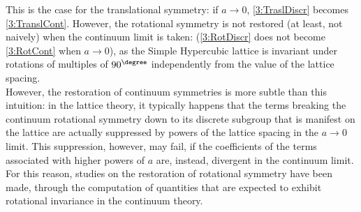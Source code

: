 This is the case for the translational symmetry: if $a\to0$, \eqref{3:TraslDiscr} becomes \eqref{3:TranslCont}.
However, the rotational symmetry is not restored (at least, not naively) when the continuum limit is taken: (\eqref{3:RotDiscr} does not become \eqref{3:RotCont} when $a\to0$), as the Simple Hypercubic lattice is invariant under rotations of multiples of $90^\degree$ independently from the value of the lattice spacing.\\
However, the restoration of continuum symmetries is more subtle than this intuition: in the lattice theory, it typically happens that the terms breaking the continuum rotational symmetry down to its discrete subgroup that is manifest on the lattice are actually suppressed by powers of the lattice spacing in the $a\to 0$ limit. This suppression, however, may fail, if the coefficients of the terms associated with higher powers of $a$ are, instead, divergent in the continuum limit. For this reason, studies on the restoration of rotational symmetry have been made, through the computation of quantities that are expected to exhibit rotational invariance in the continuum theory.

